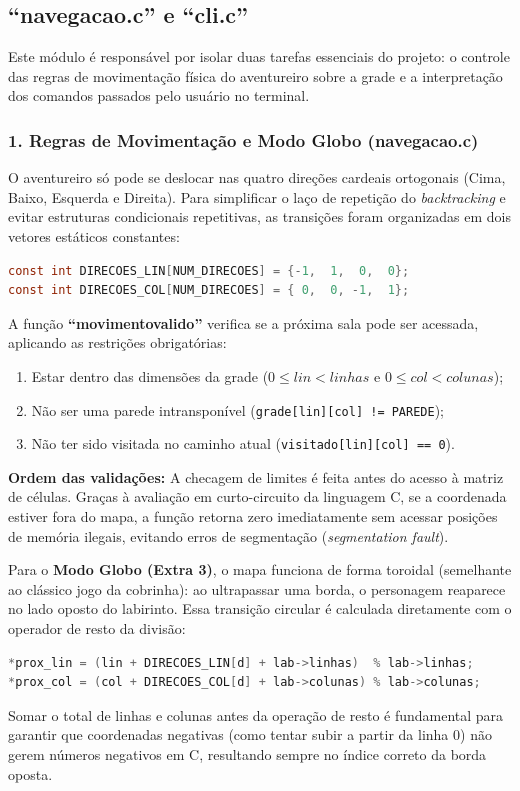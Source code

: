 \documentclass[12pt,a4paper]{article}
\renewcommand{\_}{\textunderscore\allowbreak}
\begin{document}
\subsection{“navegacao.c” e “cli.c”}

Este módulo é responsável por isolar duas tarefas essenciais do projeto: o controle das regras de movimentação física do aventureiro sobre a grade e a interpretação dos comandos passados pelo usuário no terminal.

\subsubsection*{1. Regras de Movimentação e Modo Globo (navegacao.c)}

O aventureiro só pode se deslocar nas quatro direções cardeais ortogonais (Cima, Baixo, Esquerda e Direita). Para simplificar o laço de repetição do \textit{backtracking} e evitar estruturas condicionais repetitivas, as transições foram organizadas em dois vetores estáticos constantes:
\begin{lstlisting}[language=C, caption={Vetores de deslocamento ortogonal em O(1).}]
const int DIRECOES_LIN[NUM_DIRECOES] = {-1,  1,  0,  0};
const int DIRECOES_COL[NUM_DIRECOES] = { 0,  0, -1,  1};
\end{lstlisting}

A função \textbf{“movimento\_valido”} verifica se a próxima sala pode ser acessada, aplicando as restrições obrigatórias:
\begin{enumerate}
    \item Estar dentro das dimensões da grade ($0 \le lin < linhas$ e $0 \le col < colunas$);
    \item Não ser uma parede intransponível (\texttt{grade[lin][col] != PAREDE});
    \item Não ter sido visitada no caminho atual (\texttt{visitado[lin][col] == 0}).
\end{enumerate}

\textbf{Ordem das validações:} A checagem de limites é feita antes do acesso à matriz de células. Graças à avaliação em curto-circuito da linguagem C, se a coordenada estiver fora do mapa, a função retorna zero imediatamente sem acessar posições de memória ilegais, evitando erros de segmentação (\textit{segmentation fault}).

Para o \textbf{Modo Globo (Extra 3)}, o mapa funciona de forma toroidal (semelhante ao clássico jogo da cobrinha): ao ultrapassar uma borda, o personagem reaparece no lado oposto do labirinto. Essa transição circular é calculada diretamente com o operador de resto da divisão:
\begin{lstlisting}[language=C, caption={Cálculo da próxima posição com conexão toroidal das bordas.}]
*prox_lin = (lin + DIRECOES_LIN[d] + lab->linhas)  % lab->linhas;
*prox_col = (col + DIRECOES_COL[d] + lab->colunas) % lab->colunas;
\end{lstlisting}
Somar o total de linhas e colunas antes da operação de resto é fundamental para garantir que coordenadas negativas (como tentar subir a partir da linha 0) não gerem números negativos em C, resultando sempre no índice correto da borda oposta.
\end{document}
